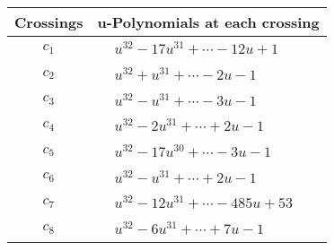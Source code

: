 \documentclass[1p]{elsarticle_modified}
\theoremstyle{definition}
\begin{document}
\begin{tabular}{m{50pt}|m{274pt}}
Crossings & \hspace{64pt}u-Polynomials at each crossing \\
\hline $$\begin{aligned}c_{1}\end{aligned}$$&$\begin{aligned}
&u^{32}-17 u^{31}+\cdots-12 u+1
\end{aligned}$\\
\hline $$\begin{aligned}c_{2}\end{aligned}$$&$\begin{aligned}
&u^{32}+u^{31}+\cdots-2 u-1
\end{aligned}$\\
\hline $$\begin{aligned}c_{3}\end{aligned}$$&$\begin{aligned}
&u^{32}- u^{31}+\cdots-3 u-1
\end{aligned}$\\
\hline $$\begin{aligned}c_{4}\end{aligned}$$&$\begin{aligned}
&u^{32}-2 u^{31}+\cdots+2 u-1
\end{aligned}$\\
\hline $$\begin{aligned}c_{5}\end{aligned}$$&$\begin{aligned}
&u^{32}-17 u^{30}+\cdots-3 u-1
\end{aligned}$\\
\hline $$\begin{aligned}c_{6}\end{aligned}$$&$\begin{aligned}
&u^{32}- u^{31}+\cdots+2 u-1
\end{aligned}$\\
\hline $$\begin{aligned}c_{7}\end{aligned}$$&$\begin{aligned}
&u^{32}-12 u^{31}+\cdots-485 u+53
\end{aligned}$\\
\hline $$\begin{aligned}c_{8}\end{aligned}$$&$\begin{aligned}
&u^{32}-6 u^{31}+\cdots+7 u-1
\end{aligned}$\\

\end{tabular}
\end{document}
